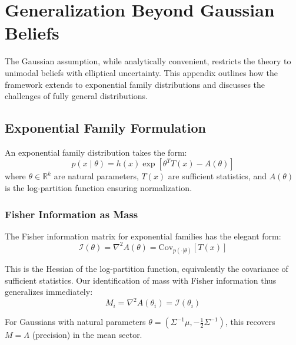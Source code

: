 \documentclass[12pt]{article}
\begin{document}

\section{Generalization Beyond Gaussian Beliefs}
\label{app:exponential_family}

The Gaussian assumption, while analytically convenient, restricts the theory to unimodal beliefs with elliptical uncertainty. This appendix outlines how the framework extends to exponential family distributions and discusses the challenges of fully general distributions.

\subsection{Exponential Family Formulation}

An exponential family distribution takes the form:
\begin{equation}
p(x \mid \theta) = h(x) \exp\left[\theta^T T(x) - A(\theta)\right]
\end{equation}
where $\theta \in \mathbb{R}^k$ are natural parameters, $T(x)$ are sufficient statistics, and $A(\theta)$ is the log-partition function ensuring normalization.

\subsubsection{Fisher Information as Mass}

The Fisher information matrix for exponential families has the elegant form:
\begin{equation}
\mathcal{I}(\theta) = \nabla^2 A(\theta) = \mathrm{Cov}_{p(\cdot|\theta)}[T(x)]
\end{equation}

This is the Hessian of the log-partition function, equivalently the covariance of sufficient statistics. Our identification of mass with Fisher information thus generalizes immediately:
\begin{equation}
\boxed{M_i = \nabla^2 A(\theta_i) = \mathcal{I}(\theta_i)}
\end{equation}

For Gaussians with natural parameters $\theta = (\Sigma^{-1}\mu, -\frac{1}{2}\Sigma^{-1})$, this recovers $M = \Lambda$ (precision) in the mean sector.
\end{document}
